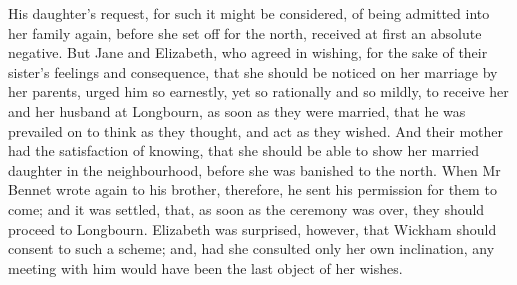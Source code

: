 His daughter's request, for such it might be considered, of being admitted into her family again, before she set off for the north, received at first an absolute negative. But Jane and Elizabeth, who agreed in wishing, for the sake of their sister's feelings and consequence, that she should be noticed on her marriage by her parents, urged him so earnestly, yet so rationally and so mildly, to receive her and her husband at Longbourn, as soon as they were married, that he was prevailed on to think as they thought, and act as they wished. And their mother had the satisfaction of knowing, that she should be able to show her married daughter in the neighbourhood, before she was banished to the north. When Mr Bennet wrote again to his brother, therefore, he sent his permission for them to come; and it was settled, that, as soon as the ceremony was over, they should proceed to Longbourn. Elizabeth was surprised, however, that Wickham should consent to such a scheme; and, had she consulted only her own inclination, any meeting with him would have been the last object of her wishes.


